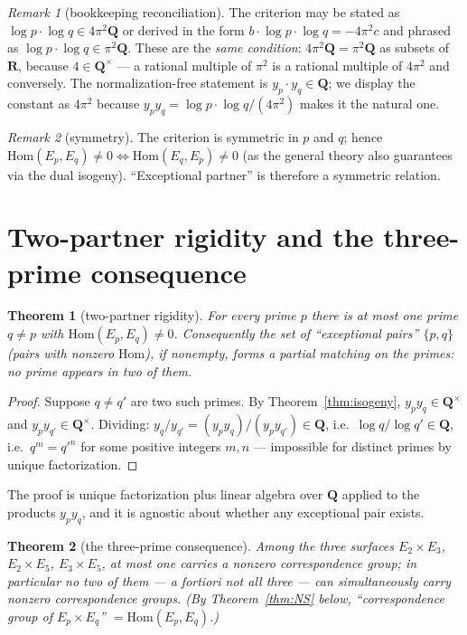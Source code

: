 \documentclass[11pt]{article}
\newtheorem{theorem}{Theorem}
\theoremstyle{definition}
\theoremstyle{remark}
\newtheorem{remark}{Remark}
\newcommand{\Q}{\mathbf{Q}}
\newcommand{\R}{\mathbf{R}}
\newcommand{\Hom}{\mathrm{Hom}}
\begin{document}
\begin{remark}[bookkeeping reconciliation]
\label{rem:bookkeeping}
The criterion may be stated as $\log p\cdot\log q \in 4\pi^2\Q$ or derived in
the form $b\cdot\log p\cdot\log q = -4\pi^2 c$ and phrased as
$\log p\cdot\log q \in \pi^2\Q$. These are the \emph{same condition}:
$4\pi^2\Q = \pi^2\Q$ as subsets of $\R$, because $4 \in \Q^\times$ --- a
rational multiple of $\pi^2$ is a rational multiple of $4\pi^2$ and
conversely. The normalization-free statement is $y_p\cdot y_q \in \Q$; we
display the constant as $4\pi^2$ because
$y_p y_q = \log p\cdot\log q/(4\pi^2)$ makes it the natural one.
\end{remark}

\begin{remark}[symmetry]
\label{rem:symmetry}
The criterion is symmetric in $p$ and $q$; hence
$\Hom(E_p, E_q) \neq 0 \iff \Hom(E_q, E_p) \neq 0$ (as the general theory
also guarantees via the dual isogeny). ``Exceptional partner'' is therefore
a symmetric relation.
\end{remark}

\section{Two-partner rigidity and the three-prime consequence}
\label{sec:familykill}

\begin{theorem}[two-partner rigidity]
\label{thm:twopartner}
For every prime $p$ there is at most one prime $q \neq p$ with
$\Hom(E_p, E_q) \neq 0$. Consequently the set of ``exceptional pairs''
$\{p, q\}$ (pairs with nonzero $\Hom$), if nonempty, forms a \emph{partial
matching} on the primes: no prime appears in two of them.
\end{theorem}

\begin{proof}
Suppose $q \neq q'$ are two such primes. By Theorem~\ref{thm:isogeny},
$y_p y_q \in \Q^\times$ and $y_p y_{q'} \in \Q^\times$. Dividing:
$y_q / y_{q'} = (y_p y_q)/(y_p y_{q'}) \in \Q$, i.e.\
$\log q / \log q' \in \Q$, i.e.\ $q^m = q'^n$ for some positive integers
$m, n$ --- impossible for distinct primes by unique factorization.
\end{proof}

The proof is unique factorization plus linear algebra over $\Q$ applied to
the products $y_p y_q$, and it is agnostic about whether any exceptional
pair exists.

\begin{theorem}[the three-prime consequence]
\label{thm:coherence}
Among the three surfaces $E_2\times E_3$, $E_2\times E_5$, $E_3\times E_5$,
at most one carries a nonzero correspondence group; in particular no two of
them --- a fortiori not all three --- can simultaneously carry nonzero
correspondence groups. (By Theorem~\ref{thm:NS} below,
``correspondence group of $E_p\times E_q$'' $= \Hom(E_p, E_q)$.)
\end{theorem}
\end{document}
